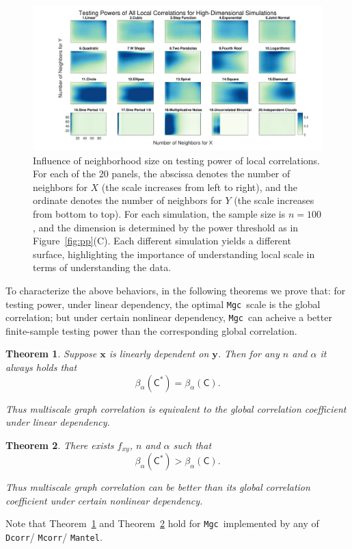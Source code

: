\documentclass[11pt]{article}
\providecommand{\sct}[1]{{\sc \texttt{#1}}}
\providecommand{\mb}[1]{\boldsymbol{#1}}
\newcommand{\G}{\mathsf{C}}
\newcommand{\Mgc}{\sct{Mgc}}
\newcommand{\Dcorr}{\sct{Dcorr}}
\newcommand{\Mcorr}{\sct{Mcorr}}
\newcommand{\Mantel}{\sct{Mantel}}
\newtheorem{thm}{Theorem}
\begin{document}
\begin{figure}[htbp]
\includegraphics[width=1.0\textwidth]{Figures/FigHDHeat}
\caption{Influence of neighborhood size on testing power of local correlations.
For each of the 20 panels, the abscissa denotes the number of neighbors for $X$ (the scale increases from left to right), and the ordinate denotes the number of neighbors for $Y$ (the scale increases from bottom to top). For each simulation, the sample size is $n=100$, and the dimension is determined by the power threshold as in Figure~\ref{fig:pp}(C). Each different simulation yields a different surface, highlighting the importance of understanding local scale in terms of understanding the data. }
\label{figSim6}
\end{figure}

To characterize the above behaviors, in the following theorems we prove that: for testing power, under linear dependency, the optimal \Mgc~scale is the global correlation; but under certain nonlinear dependency, \Mgc~can acheive a better finite-sample testing power than the corresponding global correlation. 

\begin{thm}
\label{thm2}
Suppose $\mb{x}$ is linearly dependent on $\mb{y}$. Then for any $n$ and $\alpha$ it always holds that
\begin{equation}
\beta_{\alpha}(\G^{*}) = \beta_{\alpha}(\G).
\end{equation}

Thus multiscale graph correlation is equivalent to the global correlation coefficient under linear dependency.
\end{thm}

\begin{thm}
\label{thm3}
There exists $f_{xy}$, $n$ and $\alpha$ such that 
\begin{equation}
\beta_{\alpha}(\G^{*}) > \beta_{\alpha}(\G).
\end{equation}

Thus multiscale graph correlation can be better than its global correlation coefficient under certain nonlinear dependency.
\end{thm}
Note that Theorem~\ref{thm2} and Theorem~\ref{thm3} hold for \Mgc~implemented by any of \Dcorr / \Mcorr / \Mantel.
\end{document}
